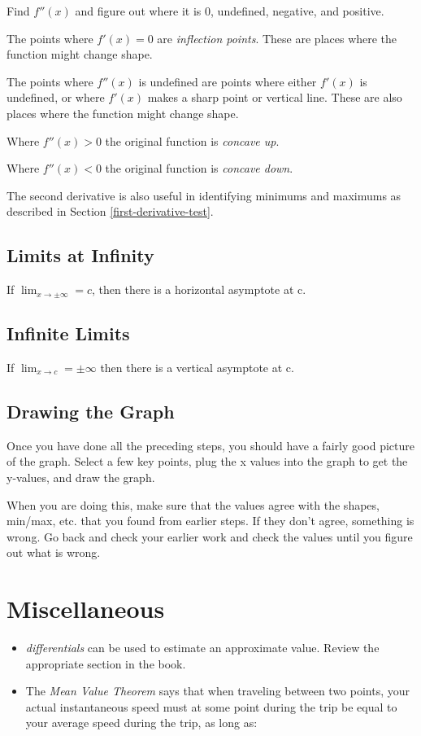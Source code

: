 \documentclass[fleqn]{article}
\begin{document}
Find $f''(x)$ and figure out where it is 0, undefined, negative, and positive.  

The points where $f'(x) = 0$ are {\em inflection points}.  These are places where the function might change shape.

The points where $f''(x)$ is undefined are points where either $f'(x)$ is undefined, or where $f'(x)$ makes a sharp point
or vertical line.  These are also places where the function might change shape.

Where $f''(x) > 0$ the original function is {\em concave up}.

Where $f''(x) < 0$ the original function is {\em concave down}.

The second derivative is also useful in identifying minimums and maximums as described in Section \ref{first-derivative-test}.

\subsection{Limits at Infinity}
If $\lim_{x \to \pm \infty} = c$, then there is a horizontal asymptote at c.

\subsection{Infinite Limits}
If $\lim_{x \to c} = \pm \infty$ then there is a vertical asymptote at c.

\subsection{Drawing the Graph}
Once you have done all the preceding steps, you should have a fairly good picture of the graph.  Select a few key
points, plug the x values into the graph to get the y-values, and draw the graph.

When you are doing this, make sure that the values agree with the shapes, min/max, etc. that you found from earlier
steps.  If they don't agree, something is wrong.  Go back and check your earlier work and check the values until you
figure out what is wrong.

\section{Miscellaneous}
\begin{itemize}
\item {\em differentials} can be used to estimate an approximate value.  Review the appropriate section in the book.
\item The {\em Mean Value Theorem} says that when traveling between two points, your actual instantaneous speed must at
  some point during the trip be equal to your average speed during the trip, as long as:
\end{itemize}
\end{document}
